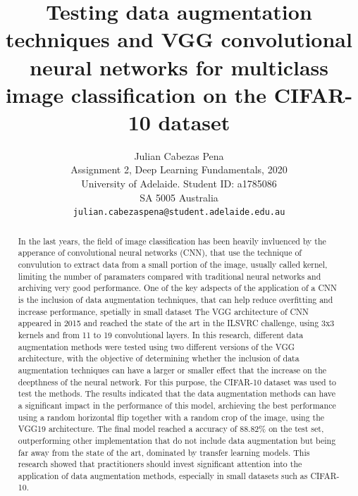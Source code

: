 \documentclass[10pt,twocolumn,letterpaper]{article}
\begin{document}
\title{Testing data augmentation techniques and VGG convolutional neural networks for multiclass image classification on the CIFAR-10 dataset }

\author{Julian Cabezas Pena\\
Assignment 2, Deep Learning Fundamentals, 2020 \\
University of Adelaide. Student ID: a1785086\\
SA 5005 Australia\\
{\tt\small julian.cabezaspena@student.adelaide.edu.au}
}

\maketitle

\begin{abstract}
	
In the last years, the field of image classification has been heavily invluenced by the apperance of convolutional neural networks (CNN), that use the technique of convulution to extract data from a small portion of the image, usually called kernel, limiting the number of paramaters compared with traditional neural networks and archiving very good performance. One of the key adspects of the application of a CNN is the inclusion of data augmentation techniques, that can help reduce overfitting and increase performance, spetially in small dataset
The VGG architecture of CNN appeared in 2015 and reached the state of the art in the ILSVRC challenge, using 3x3 kernels and from 11 to 19 convolutional layers. In this research, different data augmentation methods were tested using two different versions of the VGG architecture, with the objective of determining whether the inclusion of data augmentation techniques can have a larger or smaller effect that the increase on the deepthness of the neural network. For this purpose, the CIFAR-10 dataset was used to test the methods. The results indicated that the data augmentation methods can have a significant impact in the performance of this model, archieving the best performance using a random horizontal flip together with a random crop of the image, using the VGG19 architecture. The final model reached a accuracy of 88.82\% on the test set, outperforming other implementation that do not include data augmentation but being far away from the state of the art, dominated by transfer learning models. This research showed that practitioners should invest significant attention into the application of data augmentation methods, especially in small datasets such as CIFAR-10.

\end{abstract}
\end{document}
